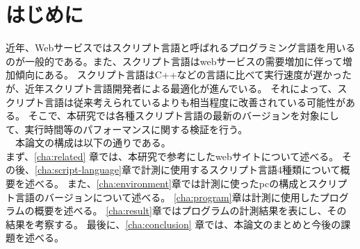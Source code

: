 \chapter{はじめに}
\label{cha:intro}
近年、Webサービスではスクリプト言語と呼ばれるプログラミング言語を用いるのが一般的である。また、スクリプト言語はwebサービスの需要増加に伴って増加傾向にある。
スクリプト言語はC++などの言語に比べて実行速度が遅かったが、近年スクリプト言語開発者による最適化が進んでいる。
それによって、スクリプト言語は従来考えられているよりも相当程度に改善されている可能性がある。
そこで、本研究では各種スクリプト言語の最新のバージョンを対象にして、実行時間等のパフォーマンスに関する検証を行う。\\
　本論文の構成は以下の通りである。\\
まず、\ref{cha:related} 章では、本研究で参考にしたwebサイトについて述べる。
その後、\ref{cha:script-language}章で計測に使用するスクリプト言語4種類について概要を述べる。
また、\ref{cha:environment}章では計測に使ったpcの構成とスクリプト言語のバージョンについて述べる。
\ref{cha:program}章は計測に使用したプログラムの概要を述べる。
\ref{cha:result}章ではプログラムの計測結果を表にし、その結果を考察する。
最後に、\ref{cha:conclusion} 章では、本論文のまとめと今後の課題を述べる。